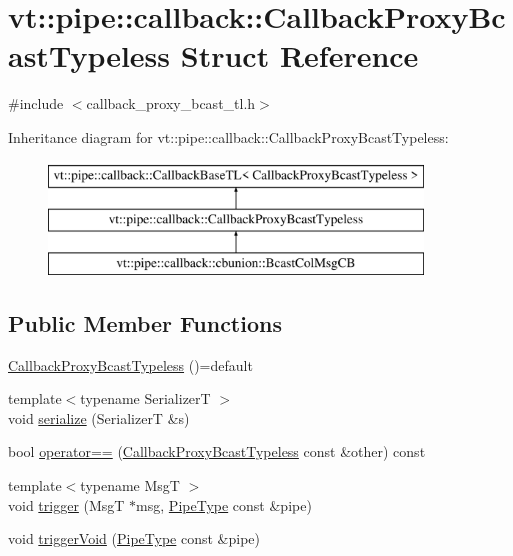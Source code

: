 \hypertarget{structvt_1_1pipe_1_1callback_1_1_callback_proxy_bcast_typeless}{}\section{vt\+:\+:pipe\+:\+:callback\+:\+:Callback\+Proxy\+Bcast\+Typeless Struct Reference}
\label{structvt_1_1pipe_1_1callback_1_1_callback_proxy_bcast_typeless}


{\ttfamily \#include $<$callback\+\_\+proxy\+\_\+bcast\+\_\+tl.\+h$>$}

Inheritance diagram for vt\+:\+:pipe\+:\+:callback\+:\+:Callback\+Proxy\+Bcast\+Typeless\+:\begin{figure}[H]
\begin{center}
\leavevmode
\includegraphics[height=3.000000cm]{structvt_1_1pipe_1_1callback_1_1_callback_proxy_bcast_typeless}
\end{center}
\end{figure}
\subsection*{Public Member Functions}
\begin{DoxyCompactItemize}
\item 
\hyperlink{structvt_1_1pipe_1_1callback_1_1_callback_proxy_bcast_typeless_aae02890f35c9e614419c2f08753e2b0c}{Callback\+Proxy\+Bcast\+Typeless} ()=default
\item 
{\footnotesize template$<$typename SerializerT $>$ }\\void \hyperlink{structvt_1_1pipe_1_1callback_1_1_callback_proxy_bcast_typeless_a8482d3a27030c2df06cc674012ec0ba7}{serialize} (SerializerT \&s)
\item 
bool \hyperlink{structvt_1_1pipe_1_1callback_1_1_callback_proxy_bcast_typeless_a6bb1166f98d162f54a03809eb0396083}{operator==} (\hyperlink{structvt_1_1pipe_1_1callback_1_1_callback_proxy_bcast_typeless}{Callback\+Proxy\+Bcast\+Typeless} const \&other) const
\item 
{\footnotesize template$<$typename MsgT $>$ }\\void \hyperlink{structvt_1_1pipe_1_1callback_1_1_callback_proxy_bcast_typeless_a43184b90b1bf96dbb6f912603fe08e37}{trigger} (MsgT $\ast$msg, \hyperlink{namespacevt_ac9852acda74d1896f48f406cd72c7bd3}{Pipe\+Type} const \&pipe)
\item 
void \hyperlink{structvt_1_1pipe_1_1callback_1_1_callback_proxy_bcast_typeless_ae6bd14be57efa51af6dfc01fca89de7c}{trigger\+Void} (\hyperlink{namespacevt_ac9852acda74d1896f48f406cd72c7bd3}{Pipe\+Type} const \&pipe)
\end{DoxyCompactItemize}


